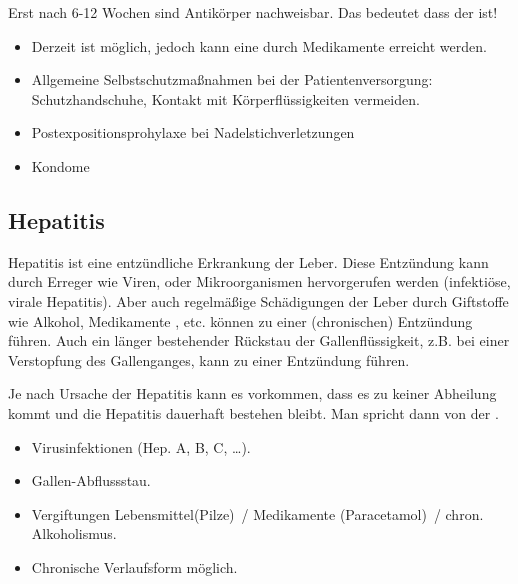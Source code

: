 { Erst nach 6-12 Wochen sind Antikörper nachweisbar. Das bedeutet dass der
 ist!
}
{
}
{}
{}
{}


{
\begin{itemize}
  \item Derzeit ist  möglich, jedoch
  kann eine  durch
  Medikamente erreicht werden.
\end{itemize}
}
{
}
{}
{}
{}

{
\begin{itemize}
  \item Allgemeine Selbstschutzmaßnahmen bei der
  Patientenversorgung: Schutzhandschuhe, Kontakt mit
  Körperflüssigkeiten vermeiden.
  \item Postexpositionsprohylaxe bei Nadelstichverletzungen
  \item Kondome
\end{itemize}
}
{
}
{}
{}
{}




\subsection{Hepatitis}
\label{topic:hepatitis-virale}\label{topic:hepatitis-toxisch}\label{topic:hepatitis}




{%
Hepatitis ist eine
entzündliche Erkrankung der Leber. Diese Entzündung kann durch Erreger wie
Viren, oder Mikroorganismen hervorgerufen werden
(infektiöse, virale Hepatitis). Aber auch
regelmäßige Schädigungen der Leber durch Giftstoffe wie
Alkohol, Medikamente , etc. können
zu einer (chronischen) Entzündung führen. Auch ein länger
bestehender Rückstau der Gallenflüssigkeit, z.B. bei einer
Verstopfung des Gallenganges, kann zu einer Entzündung
führen.

Je nach Ursache der Hepatitis kann es vorkommen, dass es zu
keiner Abheilung kommt und die Hepatitis dauerhaft bestehen
bleibt. Man spricht dann von der .} 
{
\begin{itemize}
  \item Virusinfektionen (Hep. A, B, C, \ldots ).
  \item Gallen-Abflussstau.
  \item Vergiftungen Lebensmittel(Pilze)~/
  Medikamente (Paracetamol)~/ chron. Alkoholismus.
  \item Chronische Verlaufsform möglich.
\end{itemize}
}{}{}{}

